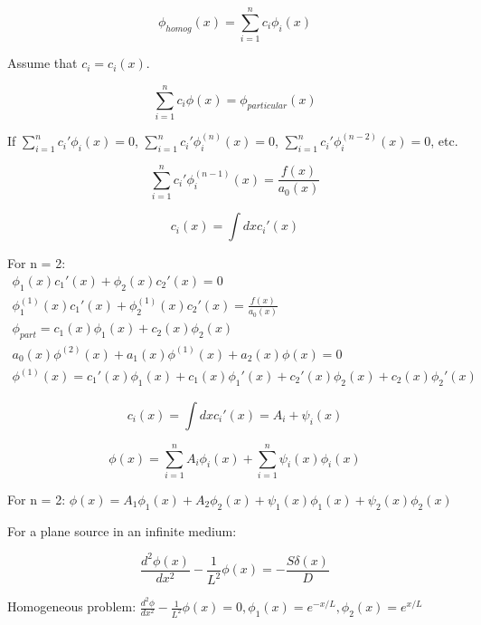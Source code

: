 \documentclass[12pt]{article}
\begin{document}
\begin{equation*}
\phi_{homog}(x) = \sum_{i=1}^n c_i\phi_i(x)
\end{equation*}

Assume that $c_i = c_i(x)$.

\begin{equation*}
\sum_{i=1}^n c_i\phi(x) = \phi_{particular}(x)
\end{equation*}

If $\sum_{i=1}^n c_i'\phi_i(x) = 0$, $\sum_{i=1}^n c_i'\phi^{(n)}_i(x) = 0$, 
$\sum_{i=1}^n c_i'\phi^{(n-2)}_i(x) = 0$, etc.

\begin{equation*}
\sum_{i=1}^n c_i'\phi^{(n-1)}_i(x) = \frac{f(x)}{a_0(x)}
\end{equation*}

\begin{equation*}
c_i(x) = \int dxc_i'(x)
\end{equation*}

For n = 2:
\vspace{-5 mm}
\begin{gather*}
\phi_1(x)c_1'(x) + \phi_2(x)c_2'(x) = 0 \\
\phi_1^{(1)}(x)c_1'(x) + \phi_2^{(1)}(x)c_2'(x) = \frac{f(x)}{a_0(x)} \\
\phi_{part} = c_1(x)\phi_1(x) + c_2(x)\phi_2(x) \\
a_0(x)\phi^{(2)}(x) + a_1(x)\phi^{(1)}(x) + a_2(x)\phi(x) = 0 \\
\phi^{(1)}(x) = c_1'(x)\phi_1(x) + c_1(x)\phi_1'(x) + c_2'(x)\phi_2(x) + c_2(x)\phi_2'(x)
\end{gather*}

\begin{equation*}
c_i(x) = \int dx c_i'(x) = A_i + \psi_i(x)
\end{equation*}

\begin{equation*}
\phi(x) = \sum_{i=1}^n A_i\phi_i(x) + \sum_{i=1}^n \psi_i(x)\phi_i(x)
\end{equation*}

For n = 2: $\phi(x) = A_1\phi_1(x) + A_2\phi_2(x) + \psi_1(x)\phi_1(x) + \psi_2(x)\phi_2(x)$


For a plane source in an infinite medium:

\begin{equation*}
\frac{d^2\phi(x)}{dx^2} - \frac{1}{L^2}\phi(x) = -\frac{S\delta(x)}{D}
\end{equation*}

Homogeneous problem: $\frac{d^2\phi}{dx^2} - \frac{1}{L^2}\phi(x)=0,\phi_1(x)=e^{-x/L},\phi_2(x)=e^{x/L}$
\end{document}
